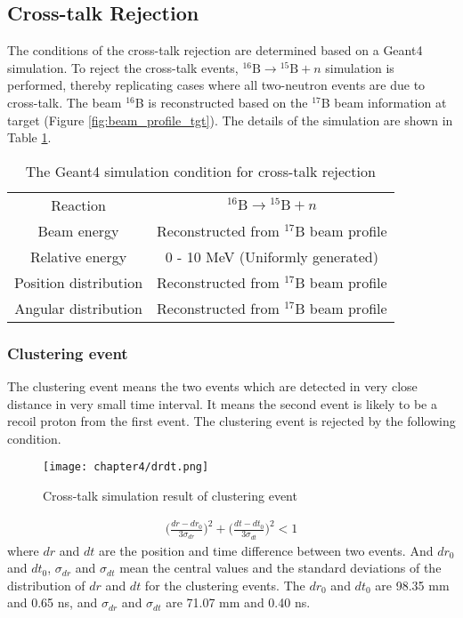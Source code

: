 \subsection{Cross-talk Rejection}
The conditions of the cross-talk rejection are determined based on a Geant4 simulation. To reject the cross-talk events, ${}^{16}\text{B} \to {}^{15}\text{B}+n$ simulation is performed, thereby replicating cases where all two-neutron events are due to cross-talk. The beam $^{16}$B is reconstructed based on the $^{17}$B beam information at target (Figure \ref{fig:beam_profile_tgt}). The details of the simulation are shown in Table \ref{tab:cross-talk_sim}.

\begin{table}
    \centering
    \begin{tabular}[h]{c|c}
        \hline 
        Reaction & ${}^{16}\text{B} \to {}^{15}\text{B}+n$ \\
        Beam energy & Reconstructed from $^{17}$B beam profile\\
        Relative energy & 0 - 10 MeV (Uniformly generated)\\
        Position distribution & Reconstructed from ${}^{17}$B beam profile\\
        Angular distribution & Reconstructed from ${}^{17}$B beam profile \\
        \hline
    \end{tabular}
    \caption{The Geant4 simulation condition for cross-talk rejection}
    \label{tab:cross-talk_sim}
\end{table}

\subsubsection{Clustering event}
The clustering event means the two events which are detected in very close distance in very small time interval. It means the second event is likely to be a recoil proton from the first event. The clustering event is rejected by the following condition.

\begin{figure}[h]
    \centering
    \texttt{[image: chapter4/drdt.png]}
    \caption{Cross-talk simulation result of clustering event}
    \label{fig:clustering}
\end{figure}

\begin{align}
    \bigg( \frac{dr-dr_0}{3\sigma_{dr}} \bigg)^2 + \bigg( \frac{dt-dt_0}{3\sigma_{dt}} \bigg)^2 < 1 
\end{align}
where $dr$ and $dt$ are the position and time difference between two events. And $dr_0$ and $dt_0$, $\sigma_{dr}$ and $\sigma_{dt}$ mean the central values and the standard deviations of the distribution of $dr$ and $dt$ for the clustering events. The $dr_0$ and $dt_0$ are 98.35 mm and 0.65 ns, and $\sigma_{dr}$ and $\sigma_{dt}$ are 71.07 mm and 0.40 ns. 

